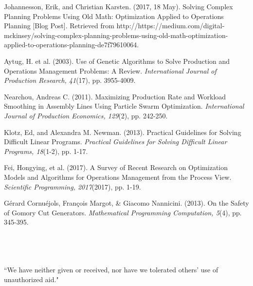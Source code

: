 \documentclass{article}
\begin{document}
	\newpage
	\begin{thebibliography}{6}
	
Johannesson, Erik, and Christian Karsten. (2017, 18 May). Solving Complex Planning Problems Using Old Math: Optimization Applied to Operations Planning [Blog Post]. Retrieved 
from http://https://medium.com/digital-mckinsey/solving-complex-planning-problems-using-old-math-optimization-applied-to-operations-planning-de7f79610064.
	
Aytug, H. et al. (2003). Use of Genetic Algorithms to Solve Production and Operations Management Problems: A Review. 
\textit{International Journal of Production Research, 41}(17), pp. 3955-4009.

Nearchou, Andreas C. (2011). Maximizing Production Rate and Workload Smoothing in Assembly Lines Using Particle Swarm Optimization. 
\textit{International Journal of Production Economics, 129}(2), pp. 242-250.

Klotz, Ed, and Alexandra M. Newman. (2013). Practical Guidelines for Solving Difficult Linear Programs. 
\textit{Practical Guidelines for Solving Difficult Linear Programs, 18}(1-2), pp. 1-17.

Fei, Hongying, et al. (2017). A Survey of Recent Research on Optimization Models and Algorithms for Operations Management from the Process View. 
\textit{Scientific Programming, 2017}(2017), pp. 1-19.

G\'{e}rard Cornu\'{e}jols, Fran\c{c}ois Margot, \& Giacomo Nannicini. (2013). On the Safety of Gomory Cut Generators. 
\textit{Mathematical Programming Computation, 5}(4), pp. 345-395.
\\
\\
\\
\\
\\
``We have neither given or received, nor have we tolerated others' use of unauthorized aid."


\end{thebibliography}
\end{document}
